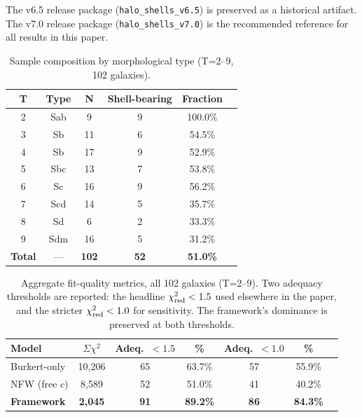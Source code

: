 The v6.5 release package (\texttt{halo\_shells\_v6.5}) is preserved as a historical artifact. The v7.0 release package (\texttt{halo\_shells\_v7.0}) is the recommended reference for all results in this paper.


\begin{table}
\centering
\caption{Sample composition by morphological type (T=2--9, 102 galaxies).}
\label{tab:sample}
\begin{tabular}{cccccc}
\toprule
T & Type & N & Shell-bearing & Fraction \\
\midrule
2 & Sab & 9 & 9 & 100.0\% \\
3 & Sb  & 11 & 6 & 54.5\% \\
4 & Sb  & 17 & 9 & 52.9\% \\
5 & Sbc & 13 & 7 & 53.8\% \\
6 & Sc  & 16 & 9 & 56.2\% \\
7 & Scd & 14 & 5 & 35.7\% \\
8 & Sd  & 6  & 2 & 33.3\% \\
9 & Sdm & 16 & 5 & 31.2\% \\
\midrule
\textbf{Total} & --- & \textbf{102} & \textbf{52} & \textbf{51.0\%} \\
\bottomrule
\end{tabular}
\end{table}

\begin{table}
\centering
\caption{Aggregate fit-quality metrics, all 102 galaxies (T=2--9). Two adequacy thresholds are reported: the headline $\chi^2_{\rm red} < 1.5$ used elsewhere in the paper, and the stricter $\chi^2_{\rm red} < 1.0$ for sensitivity. The framework's dominance is preserved at both thresholds.}
\label{tab:aggregate}
\begin{tabular}{lcccccc}
\toprule
Model & $\Sigma\chi^2$ & Adeq.\ $<1.5$ & \% & Adeq.\ $<1.0$ & \% \\
\midrule
Burkert-only & 10{,}206 & 65 & 63.7\% & 57 & 55.9\% \\
NFW (free $c$) & 8{,}589 & 52 & 51.0\% & 41 & 40.2\% \\
\textbf{Framework} & \textbf{2{,}045} & \textbf{91} & \textbf{89.2\%} & \textbf{86} & \textbf{84.3\%} \\
\bottomrule
\end{tabular}
\end{table}

